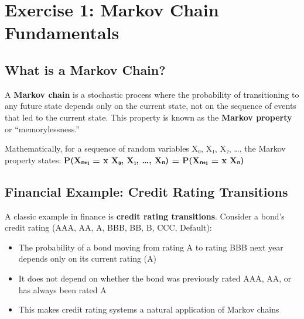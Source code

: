\documentclass[
]{article}
\providecommand{\tightlist}{%
  \setlength{\itemsep}{0pt}\setlength{\parskip}{0pt}}
\begin{document}
\hypertarget{exercise-1-markov-chain-fundamentals}{%
\section{Exercise 1: Markov Chain
Fundamentals}\label{exercise-1-markov-chain-fundamentals}}

\hypertarget{what-is-a-markov-chain}{%
\subsection{What is a Markov Chain?}\label{what-is-a-markov-chain}}

A \textbf{Markov chain} is a stochastic process where the probability of
transitioning to any future state depends only on the current state, not
on the sequence of events that led to the current state. This property
is known as the \textbf{Markov property} or ``memorylessness.''

Mathematically, for a sequence of random variables X₀, X₁, X₂, \ldots,
the Markov property states: \textbf{P(Xₙ₊₁ = x \textbar{} X₀, X₁,
\ldots, Xₙ) = P(Xₙ₊₁ = x \textbar{} Xₙ)}

\hypertarget{financial-example-credit-rating-transitions}{%
\subsection{Financial Example: Credit Rating
Transitions}\label{financial-example-credit-rating-transitions}}

A classic example in finance is \textbf{credit rating transitions}.
Consider a bond's credit rating (AAA, AA, A, BBB, BB, B, CCC, Default):

\begin{itemize}
\tightlist
\item
  The probability of a bond moving from rating A to rating BBB next year
  depends only on its current rating (A)
\item
  It does not depend on whether the bond was previously rated AAA, AA,
  or has always been rated A
\item
  This makes credit rating systems a natural application of Markov
  chains
\end{itemize}
\end{document}
